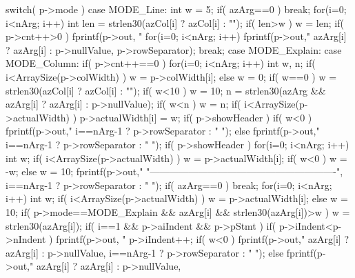 \begin{Codex}[label=shell.c,numbers=left]
{{  switch( p->mode ){
    case MODE_Line: {
      int w = 5;
      if( azArg==0 ) break;
      for(i=0; i<nArg; i++){
        int len = strlen30(azCol[i] ? azCol[i] : "");
        if( len>w ) w = len;
      }
      if( p->cnt++>0 ) fprintf(p->out, "%
      for(i=0; i<nArg; i++){
        fprintf(p->out,"%
                azArg[i] ? azArg[i] : p->nullValue, p->rowSeparator);
      }
      break;
    }
    case MODE_Explain:
    case MODE_Column: {
      if( p->cnt++==0 ){
        for(i=0; i<nArg; i++){
          int w, n;
          if( i<ArraySize(p->colWidth) ){
            w = p->colWidth[i];
          }else{
            w = 0;
          }
          if( w==0 ){
            w = strlen30(azCol[i] ? azCol[i] : "");
            if( w<10 ) w = 10;
            n = strlen30(azArg && azArg[i] ? azArg[i] : p->nullValue);
            if( w<n ) w = n;
          }
          if( i<ArraySize(p->actualWidth) ){
            p->actualWidth[i] = w;
          }
          if( p->showHeader ){
            if( w<0 ){
              fprintf(p->out,"%
                      i==nArg-1 ? p->rowSeparator : "  ");
            }else{
              fprintf(p->out,"%
                      i==nArg-1 ? p->rowSeparator : "  ");
            }
          }
        }
        if( p->showHeader ){
          for(i=0; i<nArg; i++){
            int w;
            if( i<ArraySize(p->actualWidth) ){
               w = p->actualWidth[i];
               if( w<0 ) w = -w;
            }else{
               w = 10;
            }
            fprintf(p->out,"%
                   "----------------------------------------------------------",
                    i==nArg-1 ? p->rowSeparator : "  ");
          }
        }
      }
      if( azArg==0 ) break;
      for(i=0; i<nArg; i++){
        int w;
        if( i<ArraySize(p->actualWidth) ){
           w = p->actualWidth[i];
        }else{
           w = 10;
        }
        if( p->mode==MODE_Explain && azArg[i] && strlen30(azArg[i])>w ){
          w = strlen30(azArg[i]);
        }
        if( i==1 && p->aiIndent && p->pStmt ){
          if( p->iIndent<p->nIndent ){
            fprintf(p->out, "%
          }
          p->iIndent++;
        }
        if( w<0 ){
          fprintf(p->out,"%
              azArg[i] ? azArg[i] : p->nullValue,
              i==nArg-1 ? p->rowSeparator : "  ");
        }else{
          fprintf(p->out,"%
              azArg[i] ? azArg[i] : p->nullValue,
}}}}}}
\end{Codex}
